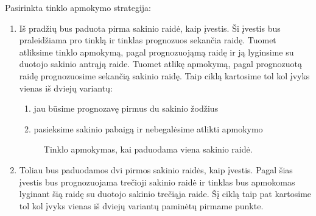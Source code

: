 Pasirinkta tinklo apmokymo strategija:
\begin{enumerate}
  \item Iš pradžių bus paduota pirma sakinio raidė, kaip įvestis. Ši įvestis bus praleidžiama pro tinklą ir tinklas prognozuos sekančia raidę. Tuomet atliksime tinklo apmokymą, pagal prognozuojąmą raidę ir ją lyginsime su duotojo sakinio antrąją raide. Tuomet atlikę apmokymą, pagal prognozuotą raidę prognozuosime sekančią sakinio raidę. Taip ciklą kartosime tol kol įvyks vienas iš dviejų variantų:
  \begin{enumerate}
    \item jau būsime prognozavę pirmus du sakinio žodžius
    \item pasieksime sakinio pabaigą ir nebegalėsime atlikti apmokymo
  \end{enumerate}
  \begin{figure}[h!]
    \centering
  \caption{Tinklo apmokymas, kai paduodama viena sakinio raidė.}
  \label{fig:taikymas1}
  \end{figure}
  \item Toliau bus paduodamos dvi pirmos sakinio raidės, kaip įvestis. Pagal šias įvestis bus prognozuojama trečioji sakinio raidė ir tinklas bus apmokomas lyginant šią raidę su duotojo sakinio trečiąja raide. Šį ciklą taip pat kartosime tol kol įvyks vienas iš dviejų variantų paminėtų pirmame punkte.
  \begin{figure}[h!]
    \centering

\end{figure}
\end{enumerate}

